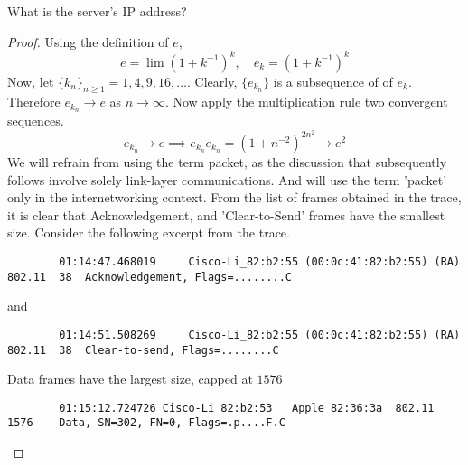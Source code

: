 \documentclass[../../main.tex]{subfiles}
\begin{document}
\begin{wts}
What is the server’s IP address?
\end{wts}
\begin{proof}
    Using the definition of $e$,
    \begin{equation}\label{definition of euler number}
    e = \lim (1+k^{-1})^{k},\quad e_k = (1+k^{-1})^{k}
    \end{equation}
    Now, let $\{k_n\}_{n\geq 1}=1,4,9,16,\ldots$. Clearly, $\{e_{k_n}\}$ is a subsequence of of $e_k$. Therefore $e_{k_n}\to e$ as $n\to\infty$. Now apply the multiplication rule two convergent sequences.
    \[
    e_{k_n}\to e\implies e_{k_n}e_{k_n}=(1+n^{-2})^{2n^2}\to e^2
    \]
    We will refrain from using the term packet, as the discussion that subsequently follows involve solely link-layer communications. And will use the term 'packet' only in the internetworking context. From the list of frames obtained in the trace, it is clear that Acknowledgement, and 'Clear-to-Send' frames have the smallest size. Consider the following excerpt from the trace.\\
    \begin{lstlisting}
        01:14:47.468019		Cisco-Li_82:b2:55 (00:0c:41:82:b2:55) (RA)	802.11	38	Acknowledgement, Flags=........C\end{lstlisting}
    and
    \begin{lstlisting}
        01:14:51.508269		Cisco-Li_82:b2:55 (00:0c:41:82:b2:55) (RA)	802.11	38	Clear-to-send, Flags=........C\end{lstlisting}
    Data frames have the largest size, capped at $1576$
    \begin{lstlisting}
        01:15:12.724726	Cisco-Li_82:b2:53	Apple_82:36:3a	802.11	1576	Data, SN=302, FN=0, Flags=.p....F.C\end{lstlisting}
\end{proof}
\end{document}
